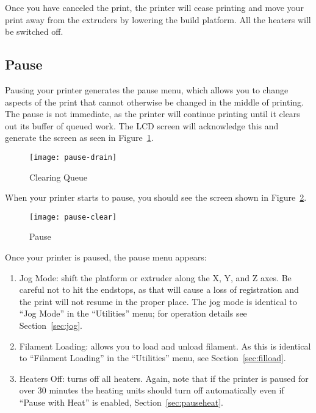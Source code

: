 Once you have canceled the print, the printer will cease printing and move your print away from the extruders by lowering the build platform.  All the heaters will be switched off.


\subsection{Pause}\label{sec:pause}

Pausing your printer generates the pause menu, which allows you to change aspects of the print that cannot otherwise be changed in the middle of printing.  The pause is not immediate, as the printer will continue printing until it clears out its buffer of queued work.  The LCD screen will acknowledge this and generate the screen as seen in Figure~\ref{fig:clear}.

\begin{figure}[!htbp]
  \centering
    \texttt{[image: pause-drain]}
    \caption{Clearing Queue}
  \label{fig:clear}
\end{figure}

When your printer starts to pause, you should see the screen shown in Figure~\ref{fig:startpause}.

\begin{figure}[!htbp]
  \centering
    \texttt{[image: pause-clear]}
    \caption{Pause}
  \label{fig:startpause}
\end{figure}

Once your printer is paused, the pause menu appears:

\begin{enumerate}
\item Jog Mode: shift the platform or extruder along the X, Y, and Z axes.  Be careful not to hit the endstops, as that will cause a loss of registration and the print will not resume in the proper place.  The jog mode is identical to ``Jog Mode'' in the ``Utilities'' menu; for operation details see Section~\ref{sec:jog}.
\item Filament Loading: allows you to load and unload filament.  As this is identical to ``Filament Loading'' in the ``Utilities'' menu, see Section~\ref{sec:filload}.
\item Heaters Off: turns off all heaters.  Again, note that if the printer is paused for over 30 minutes the heating units should turn off automatically even if ``Pause with Heat'' is enabled, Section~\ref{sec:pauseheat}.
\end{enumerate}

